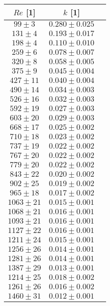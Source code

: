 \documentclass[a4paper]{article}
\begin{document}
\begin{center}
    \label{tab:title}
    \begin{tabular}{ | c | c |  p{3cm} |} \hline
    $Re$ [1] & $k$ [1]    \\ \hline
    $99 \pm3$  & $0.280\pm0.025$ \\ \hline
    $131\pm4$  & $0.193\pm0.017$ \\ \hline
    $198\pm4$  & $0.110\pm0.010$ \\ \hline
    $259\pm6$  & $0.078\pm0.007$ \\ \hline
    $320\pm8$  & $0.058\pm0.005$ \\ \hline
    $375\pm9$  & $0.045\pm0.004$ \\ \hline
    $427\pm11$ & $0.040\pm0.004$ \\ \hline
    $490\pm14$ & $0.034\pm0.003$ \\ \hline
    $526\pm16$ & $0.032\pm0.003$ \\ \hline
    $592\pm19$ & $0.027\pm0.003$ \\ \hline
    $603\pm20$ & $0.029\pm0.003$ \\ \hline
    $668\pm17$ & $0.025\pm0.002$ \\ \hline
    $710\pm18$ & $0.023\pm0.002$ \\ \hline
    $737\pm19$ & $0.022\pm0.002$ \\ \hline
    $767\pm20$ & $0.022\pm0.002$ \\ \hline
    $779\pm20$ & $0.022\pm0.002$ \\ \hline
    $843\pm22$ & $0.020\pm0.002$ \\ \hline
    $902\pm25$ & $0.019\pm0.002$ \\ \hline
    $965\pm18$ & $0.017\pm0.002$ \\ \hline
    $1063\pm21$ & $0.015\pm0.001$ \\ \hline
    $1068\pm21$ & $0.016\pm0.001$ \\ \hline
    $1093\pm21$ & $0.016\pm0.001$ \\ \hline
    $1127\pm22$ & $0.016\pm0.001$ \\ \hline
    $1211\pm24$ & $0.015\pm0.001$ \\ \hline
    $1256\pm26$ & $0.014\pm0.001$ \\ \hline
    $1281\pm26$ & $0.014\pm0.001$ \\ \hline
    $1387\pm29$ & $0.013\pm0.001$ \\ \hline
    $1214\pm25$ & $0.018\pm0.002$ \\ \hline
    $1261\pm26$ & $0.016\pm0.002$ \\ \hline
    $1460\pm31$ & $0.012\pm0.001$ \\ \hline
\end{tabular}
\end{center}
\end{document}
